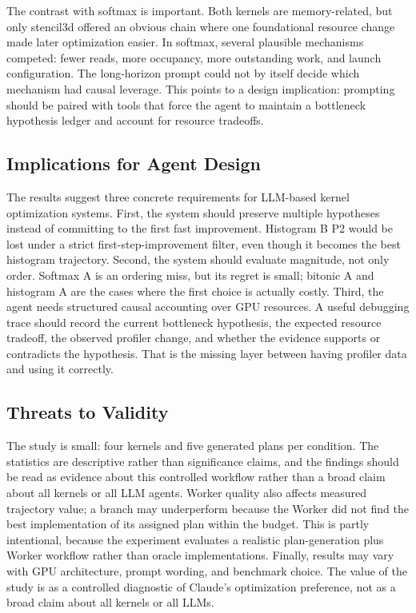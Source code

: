 \documentclass[conference]{IEEEtran}
\begin{document}
The contrast with softmax is important. Both kernels are memory-related, but
only stencil3d offered an obvious chain where one foundational resource change
made later optimization easier. In softmax, several plausible mechanisms
competed: fewer reads, more occupancy, more outstanding work, and launch
configuration. The long-horizon prompt could not by itself decide which
mechanism had causal leverage. This points to a design implication: prompting
should be paired with tools that force the agent to maintain a bottleneck
hypothesis ledger and account for resource tradeoffs.

\subsection{Implications for Agent Design}

The results suggest three concrete requirements for LLM-based kernel
optimization systems. First, the system should preserve multiple hypotheses
instead of committing to the first fast improvement. Histogram B P2 would be
lost under a strict first-step-improvement filter, even though it becomes the
best histogram trajectory. Second, the system should evaluate magnitude, not
only order. Softmax A is an ordering miss, but its regret is small; bitonic A
and histogram A are the cases where the first choice is actually costly.
Third, the agent needs structured causal accounting over GPU resources. A useful
debugging trace should record the current bottleneck hypothesis, the expected
resource tradeoff, the observed profiler change, and whether the evidence
supports or contradicts the hypothesis. That is the missing layer between
having profiler data and using it correctly.

\subsection{Threats to Validity}

The study is small: four kernels and five generated plans per condition. The
statistics are descriptive rather than significance claims, and the findings
should be read as evidence about this controlled workflow rather than a broad
claim about all kernels or all LLM agents. Worker quality also affects measured
trajectory value; a branch may underperform because the Worker did not find the
best implementation of its assigned plan within the budget.
This is partly intentional, because the experiment evaluates a realistic
plan-generation plus Worker workflow rather than oracle implementations.
Finally, results may vary with GPU architecture, prompt wording, and benchmark
choice. The value of the study is as a controlled diagnostic of Claude's
optimization preference, not as a broad claim about all kernels or all LLMs.
\end{document}
